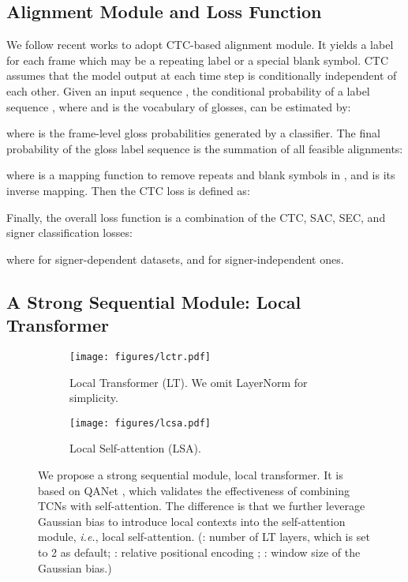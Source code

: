 \documentclass[acmsmall,screen]{acmart}
\def\ie{\emph{i.e.}} \def\Ie{\emph{I.e.}}
\begin{document}
\subsection{Alignment Module and Loss Function}
We follow recent works \cite{self-mutual, vac, stmc, cma} to adopt CTC-based alignment module.
It yields a label for each frame which may be a repeating label or a special blank symbol.
CTC assumes that the model output at each time step is conditionally independent of each other.
Given an input sequence , the conditional probability of a label sequence , where  and  is the vocabulary of glosses, can be estimated by:

where  is the frame-level gloss probabilities generated by a classifier.
The final probability of the gloss label sequence is the summation of all feasible alignments:

where  is a mapping function to remove repeats and blank symbols in , and  is its inverse mapping.
Then the CTC loss is defined as:

Finally, the overall loss function is a combination of the CTC, SAC, SEC, and signer classification losses:

where  for signer-dependent datasets, and  for signer-independent ones.


\subsection{A Strong Sequential Module: Local Transformer}
\label{sec:lt}

\begin{figure}[t]
\begin{subfigure}[t]{.48\textwidth}
 \centering
 \texttt{[image: figures/lctr.pdf]}
 \caption{Local Transformer (LT). We omit LayerNorm \cite{layernorm} for simplicity.}
 \label{fig:lctr}
\end{subfigure}
\hfill
\begin{subfigure}[t]{.48\textwidth}
  \centering
  \texttt{[image: figures/lcsa.pdf]}
  \caption{Local Self-attention (LSA).}
  \label{fig:lcsa}
\end{subfigure}
\caption{We propose a strong sequential module, local transformer. It is based on QANet \cite{qanet}, which validates the effectiveness of combining TCNs with self-attention. The difference is that we further leverage Gaussian bias \cite{gau-1, gau-2} to introduce local contexts into the self-attention module, \ie, local self-attention. (: number of LT layers, which is set to 2 as default; : relative positional encoding \cite{rpe}; : window size of the Gaussian bias.)}
\end{figure}
\end{document}
